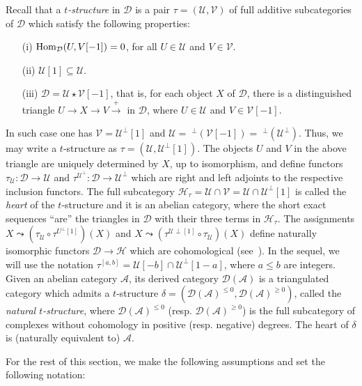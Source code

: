 \documentclass{proc-l}
\newcommand{\Hom}{{\rm Hom}}
\theoremstyle{definition}
\theoremstyle{remark}
\numberwithin{equation}{section}
\begin{document}
Recall that a {\it $t$-structure} in $\mathcal{D}$ is a pair $\tau=(\mathcal{U},\mathcal{V})$ of full additive subcategories of $\mathcal{D}$ which satisfy the following properties:
\begin{enumerate}
\item[\rm (i)]$\Hom_\mathcal{D}(U,V[-1]) = 0$, for all $U \in \mathcal{U}$ and $V \in \mathcal{V}$.
\item[\rm (ii)]$\mathcal{U}[1] \subseteq \mathcal{U}$.
\item[\rm (iii)]$\mathcal{D}=\mathcal{U}\star\mathcal{V}[-1]$, that is, for each object $X$ of $\mathcal{D}$, there is a distinguished triangle $U \to X \to V \stackrel{+}\to$ in $\mathcal{D}$, where 
$U \in \mathcal{U}$ and $V \in \mathcal{V}[-1]$.
\end{enumerate}
In such case one has $\mathcal{V}=\mathcal{U}^\perp[1]$ and $\mathcal{U}=\;^\perp(\mathcal{V}[-1])=\;^\perp(\mathcal{U}^\perp)$. Thus, we may write a $t$-structure as 
$\tau=(\mathcal{U},\mathcal{U}^\perp[1])$. The objects $U$ and $V$ in the above triangle are uniquely determined by $X$, up to isomorphism, and define functors $\tau_\mathcal{U}\colon \mathcal{D} \to \mathcal{U}$ and 
$\tau^{\mathcal{U}^\perp} \colon \mathcal{D} \to \mathcal{U}^\perp$ which are right and left adjoints to the respective inclusion functors. The full subcategory $\mathcal{H}_\tau = \mathcal{U} \cap \mathcal{V} = \mathcal{U} \cap \mathcal{U}^\perp[1]$ is called the {\it heart} of the $t$-structure and it is an abelian category, where the short exact sequences ``are'' the triangles in $\mathcal{D}$ with their three terms in $\mathcal{H}_\tau$. The assignments 
$X\leadsto(\tau_\mathcal{U} \circ \tau^{U^\perp[1]})(X)$ and 
$X \leadsto (\tau^{\mathcal{U}\perp[1]} \circ \tau_{\mathcal{U}})(X)$ define naturally isomorphic functors $\mathcal{D} \to \mathcal{H}$ which are cohomological (see~\cite{BBD}). In the sequel, we will use
the notation $\tau^{[a,b]}=\mathcal{U}[-b] \cap \mathcal{U}^\perp[1-a]$, where $a\leq b$ are integers. Given an abelian category $\mathcal{A}$, its derived category $\mathcal{D}(\mathcal{A})$ is a triangulated category which admits a 
$t$-structure $\delta=(\mathcal{D}(\mathcal{A})^{\leq0},\mathcal{D}(\mathcal{A})^{\geq0})$, called the {\it natural $t$-structure}, where 
$\mathcal{D}(\mathcal{A})^{\leq0}$ (resp. $\mathcal{D}(\mathcal{A})^{\geq0}$) is the full subcategory of complexes without cohomology in positive (resp. negative) degrees. The heart of $\delta$ is (naturally equivalent to) $\mathcal{A}$.

For the rest of this section, we make the following assumptions and set the following notation: 
\end{document}
